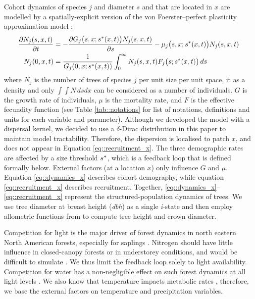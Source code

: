 Cohort dynamics of species $ j $ and diameter $ s $ and that are located in $ x $ are modelled by a spatially-explicit version of the von Foerster--perfect plasticity approximation model \citep[hereafter, von Foerster--PPA]{Strigul2008}:
\begin{align}
	\frac{\partial N_j(s, x, t)}{\partial t} &= - \frac{\partial G_j \big(s, x; {s}^{*}(x, t) \big) N_j(s, x, t)}{\partial s} - \mu_j\big(s, x; {s}^{*}(x, t) \big) N_j(s, x, t) \label{eq::dynamics_x} \\
	N_j(0, x, t) &= \frac{1}{G_j(0, x; {s}^{*}(x, t))} \int_0^{\infty} N_j(s, x, t) F_j\big(s; {s}^{*}(x, t) \big) \, ds \label{eq::recruitment_x}
\end{align}
where $ N_j $ is the number of trees of species $ j $ per unit size per unit space, it as a density and only $ \int \int N \, ds dx $ can be considered as a number of individuals. $ G $ is the growth rate of individuals, $ \mu $ is the mortality rate, and $ F $ is the effective fecundity function (see Table \ref{tab::notations} for list of notations, definitions and units for each variable and parameter). Although we developed the model with a dispersal kernel, we decided to use a $ \delta $-Dirac distribution in this paper to maintain model tractability. Therefore, the dispersion is localised to patch $ x $, and does not appear in Equation \eqref{eq::recruitment_x}. The three demographic rates are affected by a size threshold $ {s}^{*} $, which is a feedback loop that is defined formally below. External factors (at a location $ x $) only influence $ G $ and $ \mu $. Equation \eqref{eq::dynamics_x} describes cohort demography, while equation \eqref{eq::recruitment_x} describes recruitment. Together, \eqref{eq::dynamics_x}--\eqref{eq::recruitment_x} represent the structured-population dynamics of trees. We use tree diameter at breast height (\textit{dbh}) as a single \textit{i}-state and then employ allometric functions from \citet{Purves2007} to compute tree height and crown diameter.

Competition for light is the major driver of forest dynamics in north eastern North American forests, especially for saplings \citep{Pacala1996, Purves2007}. Nitrogen should have little influence in closed-canopy forests or in understorey conditions, and would be difficult to simulate \citep{Kobe2006}. We thus limit the feedback loop solely to light availability. Competition for water has a non-negligible effect on such forest dynamics at all light levels \citep{Kobe2006}. We also know that temperature impacts metabolic rates \citep{Brown2004}, therefore, we base the external factors on temperature and precipitation variables.

